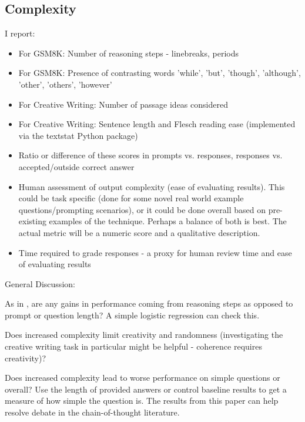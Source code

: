 \documentclass[11pt]{article}
\begin{document}
\subsection*{Complexity}

I report:

\begin{itemize}
  \item For GSM8K: Number of reasoning steps - linebreaks, periods \cite{fu_complexity-based_2023}
  \item For GSM8K: Presence of contrasting words {'while', 'but', 'though', 'although', 'other', 'others', 'however'} \cite{bhaskar_prompted_2023}
  \item For Creative Writing: Number of passage ideas considered
  \item For Creative Writing: Sentence length and Flesch reading ease (implemented via the textstat Python package) \cite{flesch_how_2016, aggarwal_textstat_nodate}
  \item Ratio or difference of these scores in prompts vs. responses, responses vs. accepted/outside correct answer
  \item Human assessment of output complexity (ease of evaluating results). This could be task specific (done for some novel real world example questions/prompting scenarios), or it could be done overall based on pre-existing examples of the technique. Perhaps a balance of both is best. The actual metric will be a numeric score and a qualitative description.
  \item Time required to grade responses - a proxy for human review time and ease of evaluating results
\end{itemize}

General Discussion:

As in \citealp{fu_complexity-based_2023}, are any gains in performance coming from reasoning steps as opposed to prompt or question length? A simple logistic regression can check this.

Does increased complexity limit creativity and randomness (investigating the creative writing task in particular might be helpful - coherence requires creativity)? 

Does increased complexity lead to worse performance on simple questions or overall? Use the length of provided answers or control baseline results to get a measure of how simple the question is. The results from this paper can help resolve debate in the chain-of-thought literature. \cite{fu_complexity-based_2023, shum_automatic_2023}
\end{document}
